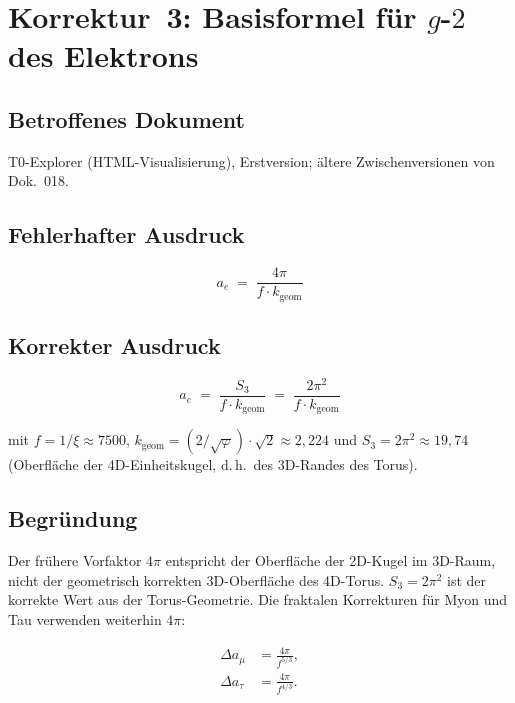 \section{\texorpdfstring{Korrektur~3: Basisformel für $g$-$2$ des Elektrons}{Korrektur 3: Basisformel für g-2 des Elektrons}}

\subsection*{Betroffenes Dokument}

T0-Explorer (HTML-Visualisierung), Erstversion; ältere Zwischenversionen
von Dok.~018.

\subsection*{Fehlerhafter Ausdruck}

\begin{equation}
  a_e \;=\; \frac{4\pi}{f \cdot k_{\text{geom}}}
  \tag{alt -- falsch}
\end{equation}

\subsection*{Korrekter Ausdruck}

\begin{equation}
  \boxed{
    a_e \;=\; \frac{S_3}{f \cdot k_{\text{geom}}}
    \;=\; \frac{2\pi^2}{f \cdot k_{\text{geom}}}
  }
  \tag{190.4}
\end{equation}

mit $f = 1/\xi \approx 7500$, $k_{\text{geom}} = (2/\sqrt{\varphi})\cdot\sqrt{2} \approx 2{,}224$
und $S_3 = 2\pi^2 \approx 19{,}74$ (Oberfläche der 4D-Einheitskugel,
d.\,h.\ des 3D-Randes des Torus).

\subsection*{Begründung}

Der frühere Vorfaktor $4\pi$ entspricht der Oberfläche der 2D-Kugel im
3D-Raum, nicht der geometrisch korrekten 3D-Oberfläche des 4D-Torus.
$S_3 = 2\pi^2$ ist der korrekte Wert aus der Torus-Geometrie. Die
fraktalen Korrekturen für Myon und Tau verwenden weiterhin $4\pi$:

\begin{align}
  \Delta a_\mu  &= \frac{4\pi}{f^{5/3}}, \tag{190.5}\\
  \Delta a_\tau &= \frac{4\pi}{f^{4/3}}. \tag{190.6}
\end{align}

